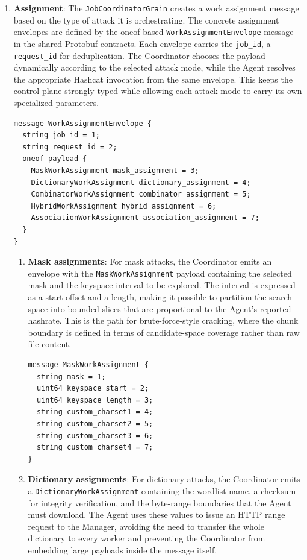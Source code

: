 \begin{enumerate}
\begin{verbatim}
message WorkRequest {
  AgentId Agent_id = 1;
  string job_id = 2;
  uint64 current_hashrate = 3;
}
\end{verbatim}

    \item \textbf{Assignment}: The \verb|JobCoordinatorGrain| creates a work assignment message based on the type of attack it is orchestrating. The concrete assignment envelopes are defined by the oneof-based \verb|WorkAssignmentEnvelope| message in the shared Protobuf contracts. Each envelope carries the \verb|job_id|, a \verb|request_id| for deduplication. The Coordinator chooses the payload dynamically according to the selected attack mode, while the Agent resolves the appropriate Hashcat invocation from the same envelope. This keeps the control plane strongly typed while allowing each attack mode to carry its own specialized parameters.

\begin{verbatim}
message WorkAssignmentEnvelope {
  string job_id = 1;
  string request_id = 2;
  oneof payload {
    MaskWorkAssignment mask_assignment = 3;
    DictionaryWorkAssignment dictionary_assignment = 4;
    CombinatorWorkAssignment combinator_assignment = 5;
    HybridWorkAssignment hybrid_assignment = 6;
    AssociationWorkAssignment association_assignment = 7;
  }
}
\end{verbatim}

    \begin{enumerate}
        \item \textbf{Mask assignments}: For mask attacks, the Coordinator emits an envelope with the \verb|MaskWorkAssignment| payload containing the selected mask and the keyspace interval to be explored. The interval is expressed as a start offset and a length, making it possible to partition the search space into bounded slices that are proportional to the Agent's reported hashrate. This is the path for brute-force-style cracking, where the chunk boundary is defined in terms of candidate-space coverage rather than raw file content.

\begin{verbatim}
message MaskWorkAssignment {
  string mask = 1;
  uint64 keyspace_start = 2;
  uint64 keyspace_length = 3;
  string custom_charset1 = 4;
  string custom_charset2 = 5;
  string custom_charset3 = 6;
  string custom_charset4 = 7;
}
\end{verbatim}

        \item \textbf{Dictionary assignments}: For dictionary attacks, the Coordinator emits a \verb|DictionaryWorkAssignment| containing the wordlist name, a checksum for integrity verification, and the byte-range boundaries that the Agent must download. The Agent uses these values to issue an HTTP range request to the Manager, avoiding the need to transfer the whole dictionary to every worker and preventing the Coordinator from embedding large payloads inside the message itself.


\end{enumerate}
\end{enumerate}
